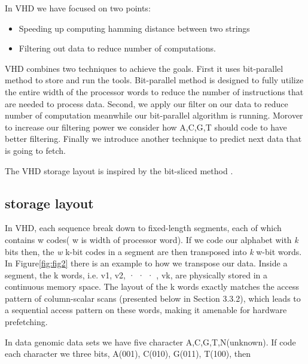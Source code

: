 In VHD we have focused on two points:
\begin{itemize}
\item Speeding up computing hamming distance between two strings
\item Filtering out data to reduce number of computations.
\end{itemize}
  
 VHD combines two techniques to achieve the goals. First it uses bit-parallel method to store and run the tools. Bit-parallel method is designed to fully utilize the entire width of the processor words to reduce the number of instructions that are needed to process data. Second, we apply  our filter on our data to reduce number of computation meanwhile our bit-parallel algorithm is running. Morover to increase our filtering power we consider how A,C,G,T should code to have better filtering. Finally we introduce another technique to predict next data that is going to fetch.
 
 The VHD storage layout is inspired by the bit-sliced method \cite{O_Neil_1997}. 
 \subsection{storage layout}
 In VHD, each sequence break down to fixed-length segments, each of which contains w codes( w is width of processor word). If we code our alphabet with \emph{k} bits then, the \emph{w} k-bit codes in a segment are then transposed into \emph{k} w-bit words. In Figure\ref{fig:fig2} there is an example to how we transpose our data. Inside a segment, the k words, i.e. v1, v2, · · · , vk, are physically
stored in a continuous memory space. The layout of the k words exactly
matches the access pattern of column-scalar scans (presented
below in Section 3.3.2), which leads to a sequential access pattern
on these words, making it amenable for hardware prefetching.
 
 In data genomic data sets we have five character A,C,G,T,N(unknown). If code each character we three bits, A(001), C(010), G(011), T(100), then 
 
  
  
  
  
  